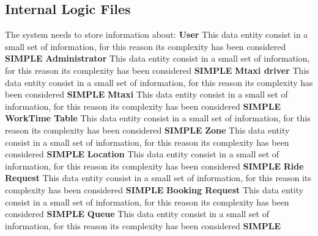 \documentclass[11pt,titlepage]{article} %
\begin{document}
  \subsection{Internal Logic Files}
     The system needs to store information about: \newline \newline
     \textbf{User}\newline
     This data entity consist in a small set of information, for this reason its complexity has been considered \textbf{SIMPLE}\newline\newline
     \textbf{Administrator}\newline
     This data entity consist in a small set of information, for this reason its complexity has been considered \textbf{SIMPLE}\newline\newline
     \textbf{Mtaxi driver}\newline
     This data entity consist in a small set of information, for this reason its complexity has been considered \textbf{SIMPLE}\newline\newline
     \noindent \textbf{Mtaxi}\newline
     This data entity consist in a small set of information, for this reason its complexity has been considered \textbf{SIMPLE}\newline\newline
     \textbf{WorkTime Table}\newline
     This data entity consist in a small set of information, for this reason its complexity has been considered \textbf{SIMPLE}\newline\newline
     \textbf{Zone}\newline
     This data entity consist in a small set of information, for this reason its complexity has been considered \textbf{SIMPLE}\newline\newline
     \textbf{Location}\newline
     This data entity consist in a small set of information, for this reason its complexity has been considered \textbf{SIMPLE}\newline\newline
     \textbf{Ride Request} 
     This data entity consist in a small set of information, for this reason its complexity has been considered \textbf{SIMPLE}\newline\newline
     \textbf{Booking Request}
     This data entity consist in a small set of information, for this reason its complexity has been considered \textbf{SIMPLE}\newline\newline
     \textbf{Queue}
     This data entity consist in a small set of information, for this reason its complexity has been considered \textbf{SIMPLE}\newline
     
\end{document}

